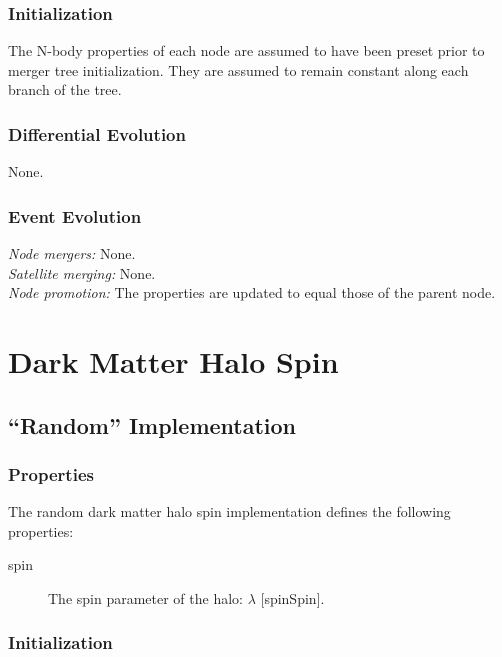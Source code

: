 \subsubsection{Initialization}

The N-body properties of each \gls{node} are assumed to have been preset prior to merger tree initialization. They are assumed to remain constant along each branch of the tree.

\subsubsection{Differential Evolution}

None.

\subsubsection{Event Evolution}

\noindent\emph{Node mergers:} None.\\

\noindent\emph{Satellite merging:} None.\\

\noindent\emph{Node promotion:} The properties are updated to equal those of the parent node.\\

\section{Dark Matter Halo Spin}\label{sec:DarkMatterHaloSpinComponent}

\subsection{``Random'' Implementation}

\subsubsection{Properties}

The random dark matter halo spin implementation defines the following properties:
\begin{description}
 \item [{\normalfont \ttfamily spin}] The spin parameter of the halo: $\lambda$ [{\normalfont \ttfamily spinSpin}].
\end{description}

\subsubsection{Initialization}

